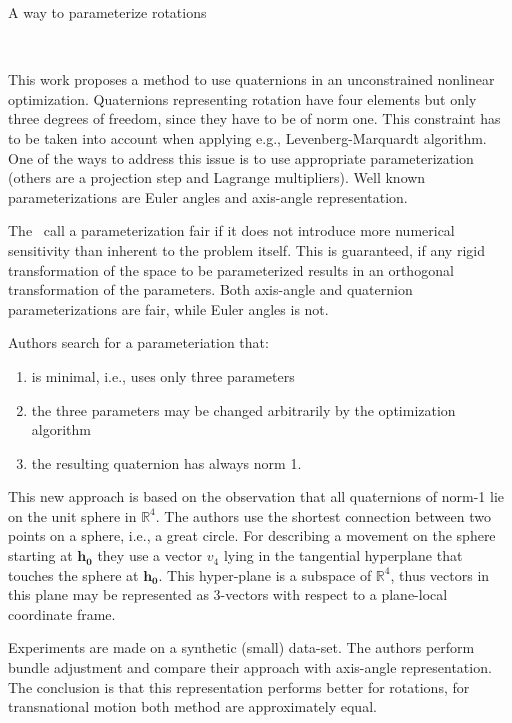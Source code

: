 \documentclass[10pt]{article}         %
\begin{document}
\begin{enumerate}
  {\Large \item A way to parameterize rotations}~\cite{schmidt2001using}

  This work proposes a method to use quaternions in an unconstrained
  nonlinear optimization.  Quaternions representing rotation have four
  elements but only three degrees of freedom, since they have to be of
  norm one.  This constraint has to be taken into account when
  applying e.g., Levenberg-Marquardt algorithm.  One of the ways to
  address this issue is to use appropriate parameterization (others
  are a projection step and Lagrange multipliers). Well known
  parameterizations are Euler angles and axis-angle representation.

  The~\cite{hornegger1999representation} call a parameterization fair if
  it does not introduce more numerical sensitivity than inherent to
  the problem itself.  This is guaranteed, if any rigid transformation
  of the space to be parameterized results in an orthogonal
  transformation of the parameters.  Both axis-angle and quaternion
  parameterizations are fair, while Euler angles is not.

  Authors search for a parameteriation that:
  \begin{enumerate}
  \item is minimal, i.e., uses only three parameters
  \item the three parameters may be changed arbitrarily by the
    optimization algorithm
  \item the resulting quaternion has always norm 1.
  \end{enumerate}

  This new approach is based on the observation that all quaternions
  of norm-1 lie on the unit sphere in $\mathbb{R}^4$.  The authors use
  the shortest connection between two points on a sphere, i.e., a great
  circle.  For describing a movement on the sphere starting at
  $\mathbf{h_0}$ they use a vector $v_4$ lying in the tangential
  hyperplane that touches the sphere at $\mathbf{h_0}$. This
  hyper-plane is a subspace of $\mathbb{R}^4$, thus vectors in this
  plane may be represented as 3-vectors with respect to a plane-local
  coordinate frame.

  Experiments are made on a synthetic (small) data-set.  The authors
  perform bundle adjustment and compare their approach with axis-angle
  representation.  The conclusion is that this representation performs
  better for rotations, for transnational motion both method are
  approximately equal.

\end{enumerate}

{} 
\end{document}
